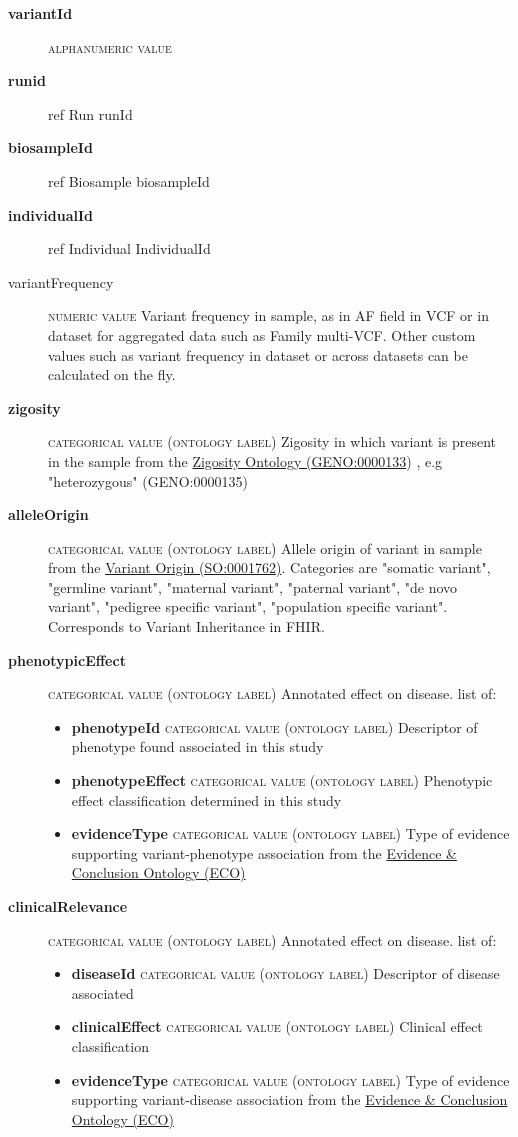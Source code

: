 \documentclass[a4paper, 10pt]{article}        %
\begin{document}
  \begin{description}
  	\item[\textbf{variantId}]  {\textsc{alphanumeric value}} 
	\item[\textbf{runid}] ref Run runId
	\item[\textbf{biosampleId}] ref Biosample biosampleId
	\item[\textbf{individualId}] ref Individual IndividualId
	\item[variantFrequency] {\textsc{numeric value}} Variant frequency in sample, as in AF field in VCF or in dataset for aggregated data such as Family multi-VCF. Other custom values such as variant frequency in dataset or across datasets can be calculated on the fly. 
	\item[\textbf{zigosity}] {\textsc{categorical value (ontology label)}} Zigosity in which variant is present in the sample from the \href{link}{Zigosity Ontology (GENO:0000133}) , e.g "heterozygous" (GENO:0000135)
	\item[\textbf{alleleOrigin}] {\textsc{categorical value (ontology label)}} Allele origin of variant in sample from the \href{link}{Variant Origin (SO:0001762)}. Categories are "somatic variant", "germline variant", "maternal variant", "paternal variant",  "de novo variant", "pedigree specific variant", "population specific variant". Corresponds to Variant Inheritance in FHIR.
	\item[\textbf{phenotypicEffect}]  {\textsc{categorical value (ontology label)}} Annotated effect on disease. list of:
	\begin{itemize}
				\item[] \textbf{phenotypeId} {\textsc{categorical value (ontology label)}} Descriptor of phenotype found associated in this study
				\item[] \textbf{phenotypeEffect} {\textsc{categorical value (ontology label)}} Phenotypic effect classification determined in this study
				\item[] \textbf{evidenceType} {\textsc{categorical value (ontology label)}} Type of evidence supporting variant-phenotype association from the \href{http://purl.obolibrary.org/obo/eco.owl}{Evidence \& Conclusion Ontology (ECO)}
	\end{itemize} 
\item[\textbf{clinicalRelevance}]  {\textsc{categorical value (ontology label)}} Annotated effect on disease. list of:
	\begin{itemize}
				\item[] \textbf{diseaseId} {\textsc{categorical value (ontology label)}} Descriptor of disease associated
				\item[]  \textbf{clinicalEffect} {\textsc{categorical value (ontology label)}} Clinical effect classification
				\item[]  \textbf{evidenceType} {\textsc{categorical value (ontology label)}} Type of evidence supporting variant-disease association from the \href{http://purl.obolibrary.org/obo/eco.owl}{Evidence \& Conclusion Ontology (ECO)}
	\end{itemize} 
 \end{description}
 
\end{document}
